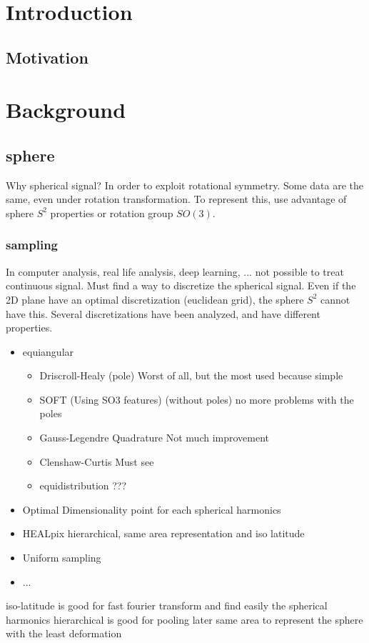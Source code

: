 \documentclass[11pt]{report}
\begin{document}
\chapter{Introduction}
\section{Motivation}

\chapter{Background}
\section{sphere}
Why spherical signal? In order to exploit rotational symmetry. Some data are the same, even under rotation transformation. To represent this, use advantage of sphere $S^2$ properties or rotation group $SO(3)$.
\subsection{sampling}
In computer analysis, real life analysis, deep learning, ... not possible to treat continuous signal. Must find a way to discretize the spherical signal. Even if the 2D plane have an optimal discretization (euclidean grid), the sphere $S^2$ cannot have this. %
Several discretizations have been analyzed, and have different properties.
\begin{itemize}
    \item equiangular %
    \begin{itemize}
        \item Driscroll-Healy (pole) %
        Worst of all, but the most used because simple
        \item SOFT (Using SO3 features) (without poles) %
        no more problems with the poles
        \item Gauss-Legendre Quadrature
        Not much improvement
        \item Clenshaw-Curtis
        Must see 
        \item equidistribution
        ???
    \end{itemize}
    \item Optimal Dimensionality
    point for each spherical harmonics
    \item HEALpix
    hierarchical, same area representation and iso latitude
    \item Uniform sampling
    \item ...
\end{itemize}
iso-latitude is good for fast fourier transform and find easily the spherical harmonics
hierarchical is good for pooling later
same area to represent the sphere with the least deformation
\end{document}
